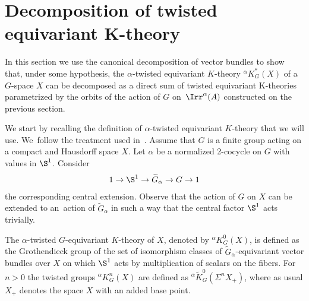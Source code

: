 %
%

\section[Decomposition of twisted equivariant K-theory]
{Decomposition of twisted equivariant $\boldsymbol K$-theory}\label{Section 3}

In this section we use the canonical decomposition of vector bundles to show that,
under some hypothesis, the $\alpha$-twisted equivariant $K$-theory $^{\alpha}K^{\ast}_{G}(X)$ of a
$G$-space $X$ can be decomposed as a direct sum of twisted equivariant K-theories parametrized
by the orbits of the action of $G$ on~$\Irr^{\alpha}(A)$ constructed on the previous section.

We start by recalling the definition of $\alpha$-twisted equivariant $K$-theory that we will use.
We~fol\-low the treatment used in~\cite[Section 7.2]{AdemRuan}.
Assume that $G$ is a finite group acting on a compact and Hausdorff space $X$.
Let $\alpha$ be a normalized 2-cocycle on $G$ with values in $\S^{1}$. Consider
\begin{gather*}
1\rightarrow \S^{1}\rightarrow \widetilde{G}_{\alpha}\rightarrow G\rightarrow 1
\end{gather*}
the corresponding central extension. Observe that the action of $G$ on $X$ can be
extended to an~action of $\widetilde{G}_{\alpha}$ in such a way that the central factor $\S^{1}$
acts trivially.

\begin{Def}\label{usualdeftwisted}
The $\alpha$-twisted $G$-equivariant $K$-theory of $X$, denoted by $^{\alpha}K_{G}^{0}(X)$,
is defined as the Grothendieck group of the set of isomorphism classes of
$\widetilde{G}_{\alpha}$-equivariant vector bundles over $X$ on which
$\S^{1}$ acts by multiplication of scalars on the fibers. For $n>0$ the twisted groups
$^{\alpha}K_{G}^{n}(X)$ are defined as
$^{\alpha}\tilde{K}_{G}^{0}(\Sigma^{n}X_{+})$, where as usual $X_{+}$
denotes the space $X$ with an added base point.
\end{Def}

